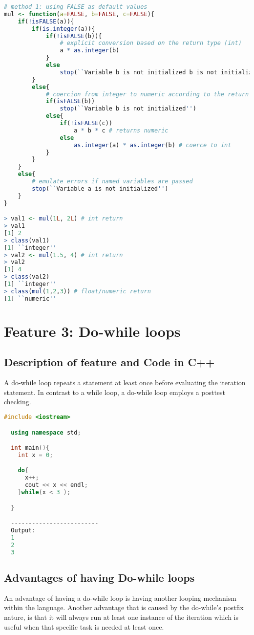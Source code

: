 \documentclass[12pt]{article}
\begin{document}
\begin{lstlisting}[language=R]
# method 1: using FALSE as default values
mul <- function(a=FALSE, b=FALSE, c=FALSE){
    if(!isFALSE(a)){
        if(is.integer(a)){
            if(!isFALSE(b)){
                # explicit conversion based on the return type (int)
                a * as.integer(b)
            }
            else
                stop(``Variable b is not initialized b is not initialized'')
        }
        else{
            # coercion from integer to numeric according to the return type (float)
            if(isFALSE(b))
                stop(``Variable b is not initialized'')
            else{
                if(!isFALSE(c))
                    a * b * c # returns numeric
                else
                    as.integer(a) * as.integer(b) # coerce to int
            }
        }
    }
    else{
        # emulate errors if named variables are passed
        stop(``Variable a is not initialized'')
    }
}

> val1 <- mul(1L, 2L) # int return
> val1
[1] 2
> class(val1)
[1] ``integer''
> val2 <- mul(1.5, 4) # int return
> val2
[1] 4
> class(val2)
[1] ``integer''
> class(mul(1,2,3)) # float/numeric return
[1] ``numeric''
\end{lstlisting}
  
\section{Feature 3: Do-while loops}

\subsection{Description of feature and Code in C++}
A do-while loop repeats a statement at least once before evaluating the iteration statement. In contrast to a while loop, a do-while loop employs a posttest checking.

\begin{lstlisting}[language=C++]
  #include <iostream>

  using namespace std;

  int main(){
    int x = 0;

    do{
      x++;
      cout << x << endl;
    }while(x < 3 );

  }

  -------------------------
  Output:
  1
  2
  3

\end{lstlisting}

\subsection{Advantages of having Do-while loops}
An advantage of having a do-while loop is having another looping mechanism within the language. Another advantage that is caused by the do-while's postfix nature, is that it will always run at least one instance of the iteration which is useful when that specific task is needed at least once. 
\end{document}
